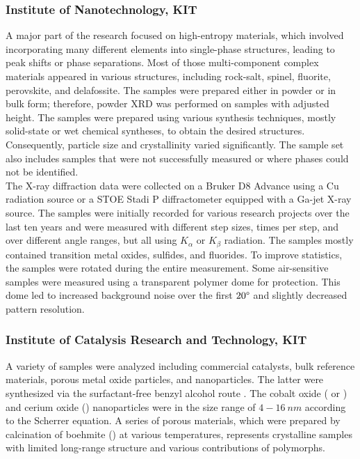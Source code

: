 \subsubsection*{Institute of Nanotechnology, KIT}

A major part of the research focused on high-entropy materials, which involved incorporating many different elements into single-phase structures, leading to peak shifts or phase separations. Most of those multi-component complex materials appeared in various structures, including rock-salt, spinel, fluorite, perovskite, and delafossite. The samples were prepared either in powder or in bulk form; therefore, powder XRD was performed on samples with adjusted height. The samples were prepared using various synthesis techniques, mostly solid-state or wet chemical syntheses, to obtain the desired structures. Consequently, particle size and crystallinity varied significantly. The sample set also includes samples that were not successfully measured or where phases could not be identified. \\

The X-ray diffraction data were collected on a Bruker D8 Advance using a Cu radiation source or a STOE Stadi P diffractometer equipped with a Ga-jet X-ray source. The samples were initially recorded for various research projects over the last ten years and were measured with different step sizes, times per step, and over different angle ranges, but all using  $K_\alpha$ or  $K_\beta$ radiation. The samples mostly contained transition metal oxides, sulfides, and fluorides. To improve statistics, the samples were rotated during the entire measurement. Some air-sensitive samples were measured using a transparent polymer dome for protection. This dome led to increased background noise over the first $20\degree$ and slightly decreased pattern resolution. \\ 

\subsubsection*{Institute of Catalysis Research and Technology, KIT}

A variety of samples were analyzed including commercial catalysts, bulk reference materials, porous metal oxide particles, and nanoparticles. The latter were synthesized via the surfactant-free benzyl alcohol route \cite{Wolf2019, Wolf2018}. The cobalt oxide ( or ) and cerium oxide () nanoparticles were in the size range of $4-16 \ \si{nm}$ according to the Scherrer equation. A series of porous  materials, which were prepared by calcination of boehmite () at various temperatures, represents crystalline samples with limited long-range structure and various contributions of  polymorphs. \\

